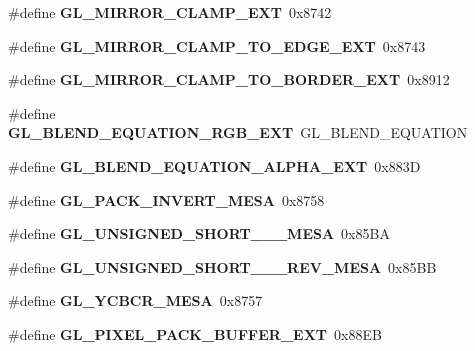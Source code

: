 \begin{DoxyCompactItemize}
\item 
\#define {\bfseries G\+L\+\_\+\+M\+I\+R\+R\+O\+R\+\_\+\+C\+L\+A\+M\+P\+\_\+\+E\+X\+T}~0x8742\label{_s_d_l__opengl_8h_a613e98533d38bf4a5ed5ca6a96db0fff}

\item 
\#define {\bfseries G\+L\+\_\+\+M\+I\+R\+R\+O\+R\+\_\+\+C\+L\+A\+M\+P\+\_\+\+T\+O\+\_\+\+E\+D\+G\+E\+\_\+\+E\+X\+T}~0x8743\label{_s_d_l__opengl_8h_a43e8af11a012de96eb54192b88365b53}

\item 
\#define {\bfseries G\+L\+\_\+\+M\+I\+R\+R\+O\+R\+\_\+\+C\+L\+A\+M\+P\+\_\+\+T\+O\+\_\+\+B\+O\+R\+D\+E\+R\+\_\+\+E\+X\+T}~0x8912\label{_s_d_l__opengl_8h_a8814d563b06eea0af82fef7f1c7c6db1}

\item 
\#define {\bfseries G\+L\+\_\+\+B\+L\+E\+N\+D\+\_\+\+E\+Q\+U\+A\+T\+I\+O\+N\+\_\+\+R\+G\+B\+\_\+\+E\+X\+T}~G\+L\+\_\+\+B\+L\+E\+N\+D\+\_\+\+E\+Q\+U\+A\+T\+I\+O\+N\label{_s_d_l__opengl_8h_a8375cbf4cbf6a5cac207c1a2691f5620}

\item 
\#define {\bfseries G\+L\+\_\+\+B\+L\+E\+N\+D\+\_\+\+E\+Q\+U\+A\+T\+I\+O\+N\+\_\+\+A\+L\+P\+H\+A\+\_\+\+E\+X\+T}~0x883\+D\label{_s_d_l__opengl_8h_a56c6273823f93796b3a7b7433cd81b68}

\item 
\#define {\bfseries G\+L\+\_\+\+P\+A\+C\+K\+\_\+\+I\+N\+V\+E\+R\+T\+\_\+\+M\+E\+S\+A}~0x8758\label{_s_d_l__opengl_8h_a99111e12773c8d5f673ffc827d1e968c}

\item 
\#define {\bfseries G\+L\+\_\+\+U\+N\+S\+I\+G\+N\+E\+D\+\_\+\+S\+H\+O\+R\+T\+\_\+\_\+\_\+\+M\+E\+S\+A}~0x85\+B\+A\label{_s_d_l__opengl_8h_a3030194a9fc8601b83c5c2354df6be7f}

\item 
\#define {\bfseries G\+L\+\_\+\+U\+N\+S\+I\+G\+N\+E\+D\+\_\+\+S\+H\+O\+R\+T\+\_\+\_\+\_\+\+R\+E\+V\+\_\+\+M\+E\+S\+A}~0x85\+B\+B\label{_s_d_l__opengl_8h_a4d805e3a058338cabacccebba2fe7748}

\item 
\#define {\bfseries G\+L\+\_\+\+Y\+C\+B\+C\+R\+\_\+\+M\+E\+S\+A}~0x8757\label{_s_d_l__opengl_8h_a518da63c200e221aae1b742510770eb6}

\item 
\#define {\bfseries G\+L\+\_\+\+P\+I\+X\+E\+L\+\_\+\+P\+A\+C\+K\+\_\+\+B\+U\+F\+F\+E\+R\+\_\+\+E\+X\+T}~0x88\+E\+B\label{_s_d_l__opengl_8h_aed9e58bc0e24f27a9d9771337444e766}


\end{DoxyCompactItemize}
